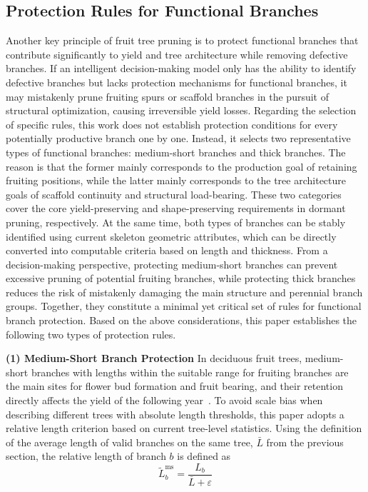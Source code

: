 \documentclass[12pt,a4paper,fontset=fandol]{ctexart}
\begin{document}
\subsection{Protection Rules for Functional Branches}\label{sec:formalization:functional}
Another key principle of fruit tree pruning is to protect functional branches that contribute significantly to yield and tree architecture while removing defective branches. If an intelligent decision-making model only has the ability to identify defective branches but lacks protection mechanisms for functional branches, it may mistakenly prune fruiting spurs or scaffold branches in the pursuit of structural optimization, causing irreversible yield losses.
Regarding the selection of specific rules, this work does not establish protection conditions for every potentially productive branch one by one. Instead, it selects two representative types of functional branches: medium-short branches and thick branches. The reason is that the former mainly corresponds to the production goal of retaining fruiting positions, while the latter mainly corresponds to the tree architecture goals of scaffold continuity and structural load-bearing. These two categories cover the core yield-preserving and shape-preserving requirements in dormant pruning, respectively. At the same time, both types of branches can be stably identified using current skeleton geometric attributes, which can be directly converted into computable criteria based on length and thickness. From a decision-making perspective, protecting medium-short branches can prevent excessive pruning of potential fruiting branches, while protecting thick branches reduces the risk of mistakenly damaging the main structure and perennial branch groups. Together, they constitute a minimal yet critical set of rules for functional branch protection. Based on the above considerations, this paper establishes the following two types of protection rules.


\textbf{(1) Medium-Short Branch Protection}
In deciduous fruit trees, medium-short branches with lengths within the suitable range for fruiting branches are the main sites for flower bud formation and fruit bearing, and their retention directly affects the yield of the following year~\citep{he2018review,li2025pear}. To avoid scale bias when describing different trees with absolute length thresholds, this paper adopts a relative length criterion based on current tree-level statistics. Using the definition of the average length of valid branches on the same tree, $\bar{L}$ from the previous section, the relative length of branch $b$ is defined as
\begin{equation}\label{eq:ms_relative_length}
  \tilde{L}_b^{\text{ms}} = \frac{L_b}{\bar{L} + \varepsilon}
\end{equation}
\end{document}
